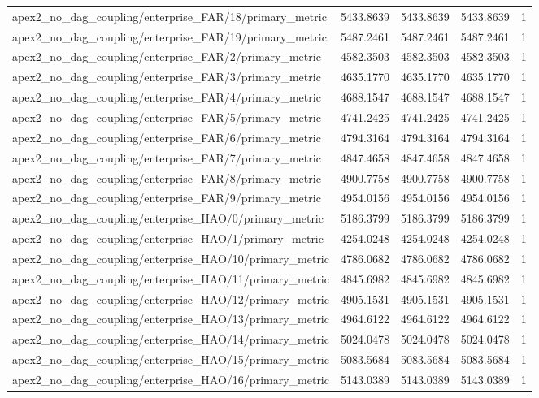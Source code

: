 \begin{table}[h]
\begin{tabular}{lrrrr}
apex2_no_dag_coupling/enterprise_FAR/18/primary_metric & 5433.8639 & 5433.8639 & 5433.8639 & 1 \\
apex2_no_dag_coupling/enterprise_FAR/19/primary_metric & 5487.2461 & 5487.2461 & 5487.2461 & 1 \\
apex2_no_dag_coupling/enterprise_FAR/2/primary_metric & 4582.3503 & 4582.3503 & 4582.3503 & 1 \\
apex2_no_dag_coupling/enterprise_FAR/3/primary_metric & 4635.1770 & 4635.1770 & 4635.1770 & 1 \\
apex2_no_dag_coupling/enterprise_FAR/4/primary_metric & 4688.1547 & 4688.1547 & 4688.1547 & 1 \\
apex2_no_dag_coupling/enterprise_FAR/5/primary_metric & 4741.2425 & 4741.2425 & 4741.2425 & 1 \\
apex2_no_dag_coupling/enterprise_FAR/6/primary_metric & 4794.3164 & 4794.3164 & 4794.3164 & 1 \\
apex2_no_dag_coupling/enterprise_FAR/7/primary_metric & 4847.4658 & 4847.4658 & 4847.4658 & 1 \\
apex2_no_dag_coupling/enterprise_FAR/8/primary_metric & 4900.7758 & 4900.7758 & 4900.7758 & 1 \\
apex2_no_dag_coupling/enterprise_FAR/9/primary_metric & 4954.0156 & 4954.0156 & 4954.0156 & 1 \\
apex2_no_dag_coupling/enterprise_HAO/0/primary_metric & 5186.3799 & 5186.3799 & 5186.3799 & 1 \\
apex2_no_dag_coupling/enterprise_HAO/1/primary_metric & 4254.0248 & 4254.0248 & 4254.0248 & 1 \\
apex2_no_dag_coupling/enterprise_HAO/10/primary_metric & 4786.0682 & 4786.0682 & 4786.0682 & 1 \\
apex2_no_dag_coupling/enterprise_HAO/11/primary_metric & 4845.6982 & 4845.6982 & 4845.6982 & 1 \\
apex2_no_dag_coupling/enterprise_HAO/12/primary_metric & 4905.1531 & 4905.1531 & 4905.1531 & 1 \\
apex2_no_dag_coupling/enterprise_HAO/13/primary_metric & 4964.6122 & 4964.6122 & 4964.6122 & 1 \\
apex2_no_dag_coupling/enterprise_HAO/14/primary_metric & 5024.0478 & 5024.0478 & 5024.0478 & 1 \\
apex2_no_dag_coupling/enterprise_HAO/15/primary_metric & 5083.5684 & 5083.5684 & 5083.5684 & 1 \\
apex2_no_dag_coupling/enterprise_HAO/16/primary_metric & 5143.0389 & 5143.0389 & 5143.0389 & 1 \\

\end{tabular}
\end{table}
